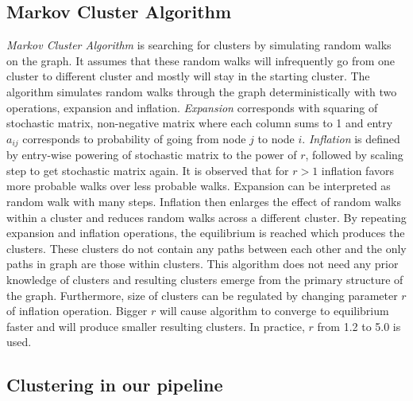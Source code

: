\subsection{Markov Cluster Algorithm}
\emph{Markov Cluster Algorithm} is searching for clusters by simulating random walks on the graph.
It assumes that these random walks will infrequently go from one cluster to different cluster and mostly will stay in the starting cluster.
The algorithm simulates random walks through the graph deterministically with two operations, expansion and inflation.
\emph{Expansion} corresponds with squaring of stochastic matrix, non-negative matrix where each column sums to 1 and entry $a_{ij}$ corresponds to probability of going from node $j$ to node $i$.
\emph{Inflation} is defined by entry-wise powering of stochastic matrix to the power of $r$, followed by scaling step to get stochastic matrix again.
It is observed that for $r>1$ inflation favors more probable walks over less probable walks.
Expansion can be interpreted as random walk with many steps.
Inflation then enlarges the effect of random walks within a cluster and reduces random walks across a different cluster.
By repeating expansion and inflation operations, the equilibrium is reached which produces the clusters.
These clusters do not contain any paths between each other and the only paths in graph are those within clusters.
This algorithm does not need any prior knowledge of clusters and resulting clusters emerge from the primary structure of the graph.
Furthermore, size of clusters can be regulated by changing parameter $r$ of inflation operation.
Bigger $r$ will cause algorithm to converge to equilibrium faster and will produce smaller resulting clusters.
In practice, $r$ from 1.2 to 5.0 is used.


\subsection{Clustering in our pipeline}
